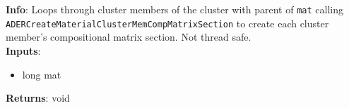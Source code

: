 \textbf{Info}: Loops through cluster members of the cluster with parent of
\texttt{mat} calling \texttt{ADERCreateMaterialClusterMemCompMatrixSection} to
create each cluster member's compositional matrix section. Not thread safe. \\

\noindent \textbf{Inputs}:
\begin{itemize}
\item{long mat}
\end{itemize}

\noindent \textbf{Returns}: void
